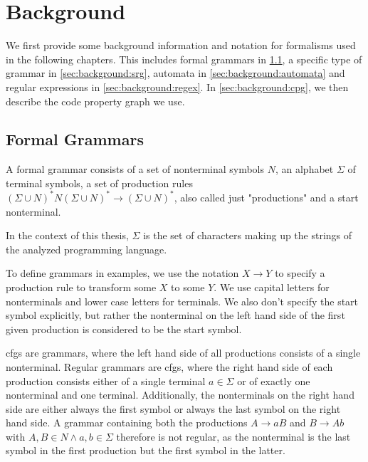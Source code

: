 \chapter{Background}
\label{chapter:Background}
\begin{comment}
What is the knowledge a undergrad student needs so that he/she can understand
your thesis? You can assume some familiarity with the very broad topic. E.g. if
you write a thesis in the area of software analysis, you do not have to explain
static/dynamic analysis as such (this is boring!). If you're a crypto guy, don't
explain AES in detail unless you try to break it in your thesis. If I stumble
across a word/term in your thesis and don't understand it, this is where I would
look it up (or on google).

Probably approx. 3-10 pages
\end{comment}

We first provide some background information and notation for formalisms used in the following chapters. This includes formal grammars in \ref{sec:background:grammars}, a specific type of grammar in \ref{sec:background:srg}, automata in \ref{sec:background:automata} and regular expressions in \ref{sec:background:regex}. In \ref{sec:background:cpg}, we then describe the code property graph we use.

\section{Formal Grammars}\label{sec:background:grammars}

A formal grammar consists of a set of nonterminal symbols $N$, an alphabet $\Sigma$ of terminal symbols, a set of production rules $(\Sigma \cup N)^*N(\Sigma \cup N)^* \rightarrow (\Sigma \cup N)^*$, also called just "productions" and a start nonterminal.

In the context of this thesis, $\Sigma$ is the set of characters making up the strings of the analyzed programming language.

To define grammars in examples, we use the notation $X \rightarrow Y$ to specify a production rule to transform some $X$ to some $Y$.
We use capital letters for nonterminals and lower case letters for terminals. We also don't specify the start symbol explicitly, but rather the nonterminal on the left hand side of the first given production is considered to be the start symbol.

\acfp{cfg} are grammars, where the left hand side of all productions consists of a single nonterminal.
Regular grammars are \acp{cfg}, where the right hand side of each production consists either of a single terminal $a \in \Sigma$ or of exactly one nonterminal and one terminal. Additionally, the nonterminals on the right hand side are either always the first symbol or always the last symbol on the right hand side. A grammar containing both the productions $A \rightarrow aB$ and $B \rightarrow Ab$ with $A, B \in N \land a, b \in \Sigma$ therefore is not regular, as the nonterminal is the last symbol in the first production but the first symbol in the latter.


